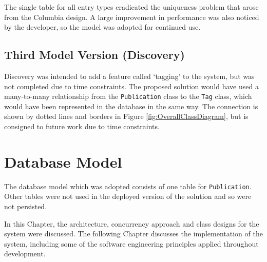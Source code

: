 The single table for all entry types eradicated the uniqueness problem that arose from the Columbia design.  A large improvement in performance was also noticed by the developer, so the model was adopted for continued use.

\subsection{Third Model Version (Discovery)}
\label{designDiscovery}
Discovery was intended to add a feature called `tagging' to the system, but was not completed due to time constraints.  The proposed solution would have used a many-to-many relationship from the \texttt{Publication} class to the \texttt{Tag} class, which would have been represented in the database in the same way.  The connection is shown by dotted lines and borders in Figure \ref{fig:OverallClassDiagram}, but is consigned to future work due to time constraints.


\section{Database Model}
\label{dbdes}
The database model which was adopted consists of one table for \texttt{Publication}.  Other tables were not used in the deployed version of the solution and so were not persisted.

In this Chapter, the architecture, concurrency approach and class designs for the system were discussed.  The following Chapter discusses the implementation of the system, including some of the software engineering principles applied throughout development.